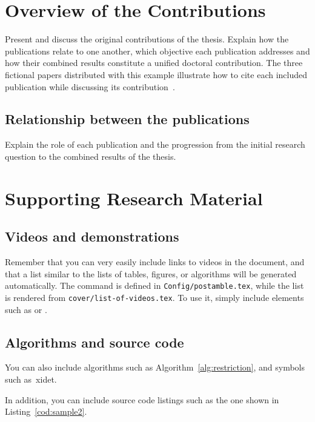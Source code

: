 {
  \section{Overview of the Contributions}

  Present and discuss the original contributions of the thesis. Explain how the publications relate to one another, which objective each publication addresses and how their combined results constitute a unified doctoral contribution. The three fictional papers distributed with this example illustrate how to cite each included publication while discussing its contribution~\cite{garcia2026paper1,garcia2026paper2,garcia2026paper3}.

  \subsection{Relationship between the publications}

  Explain the role of each publication and the progression from the initial research question to the combined results of the thesis.

  \section{Supporting Research Material}
  \subsection{Videos and demonstrations}

  Remember that you can very easily include links to videos in the document, and that a list similar to the lists of tables, figures, or algorithms will be generated automatically. The command is defined in \texttt{Config/postamble.tex}, while the list is rendered from \texttt{cover/list-of-videos.tex}. To use it, simply include elements such as  or .

  \subsection{Algorithms and source code}

  You can also include algorithms such as Algorithm~\ref{alg:restriction}, and symbols such as~\ac{xidet}.

  In addition, you can include source code listings such as the one shown in Listing~\ref{cod:sample2}.
}
